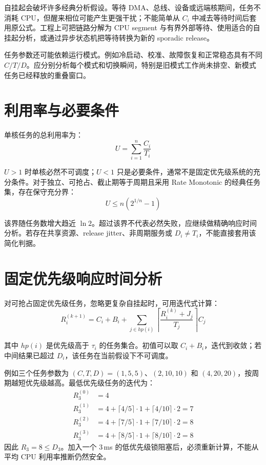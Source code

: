 自挂起会破坏许多经典分析假设。等待 DMA、总线、设备或远端核期间，任务不消耗 CPU，但醒来相位可能产生更强干扰；不能简单从 $C_i$ 中减去等待时间后套用原公式。工程上可把链路分解为 CPU segment 与有界外部等待、使用适合的自挂起分析，或通过异步状态机把等待转换为新的 sporadic release。

任务参数还可能依赖运行模式。例如冷启动、校准、故障恢复和正常稳态具有不同 $C/T/D$。应分别分析每个模式和切换瞬间，特别是旧模式工作尚未排空、新模式任务已经释放的重叠窗口。

\section{利用率与必要条件}

单核任务的总利用率为：
\begin{equation}
  U=\sum_{i=1}^{n}\frac{C_i}{T_i}
\end{equation}

$U>1$ 时单核必然不可调度；$U<1$ 只是必要条件，通常不是固定优先级系统的充分条件。对于独立、可抢占、截止期等于周期且采用 Rate Monotonic 的经典任务集，存在保守充分界：
\begin{equation}
  U \le n\left(2^{1/n}-1\right)
\end{equation}

该界随任务数增大趋近 $\ln 2$。超过该界不代表必然失败，应继续做精确响应时间分析。若存在共享资源、release jitter、非周期服务或 $D_i\ne T_i$，不能直接套用该简化判据。

\section{固定优先级响应时间分析}

对可抢占固定优先级任务，忽略更复杂自挂起时，可用迭代式计算：
\begin{equation}
  R_i^{(k+1)}=C_i+B_i+\sum_{j\in hp(i)}
  \left\lceil\frac{R_i^{(k)}+J_j}{T_j}\right\rceil C_j
\end{equation}

其中 $hp(i)$ 是优先级高于 $\tau_i$ 的任务集合。初值可以取 $C_i+B_i$，迭代到收敛；若中间结果已超过 $D_i$，该任务在当前假设下不可调度。

例如三个任务参数为 $(C,T,D)=(1,5,5)$、$(2,10,10)$ 和 $(4,20,20)$，按周期越短优先级越高。最低优先级任务的迭代为：
\begin{align}
R_3^{(0)} &= 4 \\
R_3^{(1)} &= 4+\lceil4/5\rceil\cdot1+\lceil4/10\rceil\cdot2=7 \\
R_3^{(2)} &= 4+\lceil7/5\rceil\cdot1+\lceil7/10\rceil\cdot2=8 \\
R_3^{(3)} &= 4+\lceil8/5\rceil\cdot1+\lceil8/10\rceil\cdot2=8
\end{align}
因此 $R_3=8\le D_3$。加入一个 3\,ms 的低优先级锁阻塞后，必须重新计算，不能从平均 CPU 利用率推断仍然安全。


